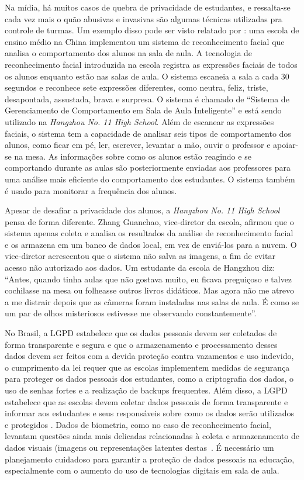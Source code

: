 Na mídia, há muitos casos de quebra de privacidade de estudantes, e ressalta-se cada vez mais o quão abusivas e invasivas são algumas técnicas utilizadas pra controle de turmas. Um exemplo disso pode ser visto relatado por : uma escola de ensino médio na China implementou um sistema de reconhecimento facial que analisa o comportamento dos alunos na sala de aula. A tecnologia de reconhecimento facial introduzida na escola registra as expressões faciais de todos os alunos enquanto estão nas salas de aula. O sistema escaneia a sala a cada 30 segundos e reconhece sete expressões diferentes, como neutra, feliz, triste, desapontada, assustada, brava e surpresa. O sistema é chamado de ``Sistema de Gerenciamento de Comportamento em Sala de Aula Inteligente'' e está sendo utilizado na \textit{Hangzhou No. 11 High School}. Além de escanear as expressões faciais, o sistema tem a capacidade de analisar seis tipos de comportamento dos alunos, como ficar em pé, ler, escrever, levantar a mão, ouvir o professor e apoiar-se na mesa. As informações sobre como os alunos estão reagindo e se comportando durante as aulas são posteriormente enviadas aos professores para uma análise mais eficiente do comportamento dos estudantes. O sistema também é usado para monitorar a frequência dos alunos.

Apesar de desafiar a privacidade dos alunos, a {\textit{Hangzhou No. 11 High School}} pensa de forma diferente. Zhang Guanchao, vice-diretor da escola, afirmou que o sistema apenas coleta e analisa os resultados da análise de reconhecimento facial e os armazena em um banco de dados local, em vez de enviá-los para a nuvem. O vice-diretor acrescentou que o sistema não salva as imagens, a fim de evitar acesso não autorizado aos dados. Um estudante da escola de Hangzhou diz: ``Antes, quando tinha aulas que não gostava muito, eu ficava preguiçoso e talvez cochilasse na mesa ou folheasse outros livros didáticos. Mas agora não me atrevo a me distrair depois que as câmeras foram instaladas nas salas de aula. É como se um par de olhos misteriosos estivesse me observando constantemente''.  

{No Brasil,} a LGPD estabelece que os dados pessoais devem ser coletados de forma transparente e segura e que o armazenamento e processamento desses dados devem ser feitos com a devida proteção contra vazamentos e uso indevido, o cumprimento da lei requer que as escolas implementem medidas de segurança para proteger os dados pessoais dos estudantes, como a criptografia dos dados, o uso de senhas fortes e a realização de backups frequentes. Além disso, a LGPD estabelece que as escolas devem coletar dados pessoais de forma transparente e informar aos estudantes e seus responsáveis sobre como os dados serão utilizados e protegidos \cite{Ferreira2022}. Dados de biometria, como no caso de reconhecimento facial, levantam questões ainda mais delicadas relacionadas à coleta e armazenamento de dados visuais (imagens ou representações latentes destas~\cite{wang2021deep}.  É necessário um planejamento cuidadoso para garantir a proteção de dados pessoais na educação, especialmente com o aumento do uso de tecnologias digitais em sala de aula.

